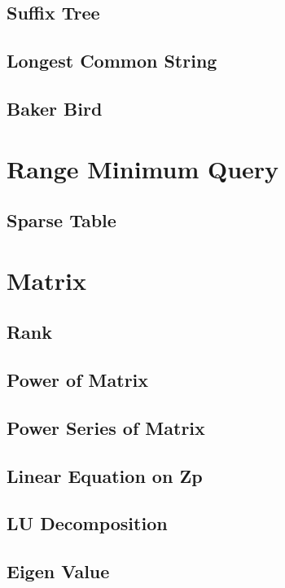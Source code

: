 \documentclass{article}
\begin{document}
    \subsection{Suffix Tree}
    \subsection{Longest Common String}
    \subsection{Baker Bird}
        

\section{Range Minimum Query}
    \subsection{Sparse Table}
        

\section{Matrix}
    \subsection{Rank}
        
    \subsection{Power of Matrix}
        
    \subsection{Power Series of Matrix}
        
    \subsection{Linear Equation on Zp}
        
    \subsection{LU Decomposition}
        
    \subsection{Eigen Value}
        
\end{document}
